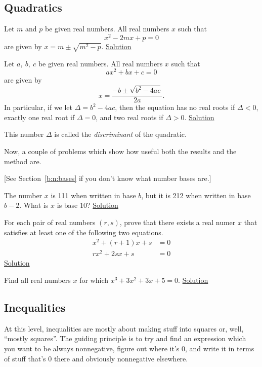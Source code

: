 \subsection{Quadratics}
\begin{result}\label{r:b:a:quad:1}
  Let $m$ and $p$ be given real numbers. All real numbers $x$ such that
  \[x^2-2mx+p=0\] are given by $x=m\pm\sqrt{m^2-p}$.
  \hyperlink{sr:b:a:quad:1}{Solution}
\end{result}
\begin{result}\label{r:b:a:quad:2}
  Let $a,\ b,\ c$ be given real numbers. All real numbers $x$ such that
  \[ax^2+bx+c=0\] are given by \[x=\frac{-b\pm\sqrt{b^2-4ac}}{2a}.\]
  In particular, if we let $\Delta=b^2-4ac$, then the equation has no real roots
  if $\Delta<0$, exactly one real root if $\Delta=0$, and two real roots if
  $\Delta>0$.
  \hyperlink{sr:b:a:quad:2}{Solution}
\end{result}
This number $\Delta$ is called the \emph{discriminant} of the quadratic.

Now, a couple of problems which show how useful both the results and the method
are.
\begin{problem}\label{p:b:a:quad:1}
  [See Section~\ref{b:n:bases} if you don't know what number bases are.]

  The number $x$ is 111 when written in base $b$, but it is 212 when written in
  base $b-2$. What is $x$ is base 10?
  \hyperlink{sp:b:a:quad:1}{Solution}
\end{problem}
\begin{problem}\label{p:b:a:quad:2}
  For each pair of real numbers $(r,s)$, prove that there exists a real numer
  $x$ that satisfies at least one of the following two equations.
  \begin{align*}
    x^2+(r+1)x+s&=0 \\
    rx^2+2sx+s&=0
  \end{align*}
  \hyperlink{sp:b:a:quad:2}{Solution}
\end{problem}
\begin{problem}\label{p:b:a:quad:3}
  Find all real numbers $x$ for which $x^3+3x^2+3x+5=0$.
  \hyperlink{sp:b:a:quad:3}{Solution}
\end{problem}
\subsection{Inequalities}
At this level, inequalities are mostly about making stuff into squares or, well,
``mostly squares''. The guiding principle is to try and find an expression which
you want to be always nonnegative, figure out where it's 0, and write it in
terms of stuff that's 0 there and obviously nonnegative elsewhere.

